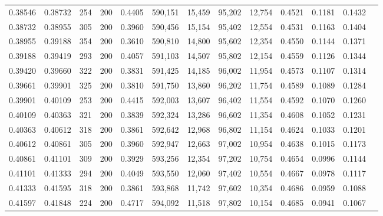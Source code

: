 \begin{tabular}{rrrrrrrrrrrrr}
0.38546 & 0.38732 &   254 & 200 &                                     0.4405 & 590,151 &  15,459 &  95,202 &  12,754 & 0.4521 & 0.1181 & 0.1432 \\
0.38732 & 0.38955 &   305 & 200 &                                     0.3960 & 590,456 &  15,154 &  95,402 &  12,554 & 0.4531 & 0.1163 & 0.1404 \\
0.38955 & 0.39188 &   354 & 200 &                                     0.3610 & 590,810 &  14,800 &  95,602 &  12,354 & 0.4550 & 0.1144 & 0.1371 \\
0.39188 & 0.39419 &   293 & 200 &                                     0.4057 & 591,103 &  14,507 &  95,802 &  12,154 & 0.4559 & 0.1126 & 0.1344 \\
0.39420 & 0.39660 &   322 & 200 &                                     0.3831 & 591,425 &  14,185 &  96,002 &  11,954 & 0.4573 & 0.1107 & 0.1314 \\
0.39661 & 0.39901 &   325 & 200 &                                     0.3810 & 591,750 &  13,860 &  96,202 &  11,754 & 0.4589 & 0.1089 & 0.1284 \\
0.39901 & 0.40109 &   253 & 200 &                                     0.4415 & 592,003 &  13,607 &  96,402 &  11,554 & 0.4592 & 0.1070 & 0.1260 \\
0.40109 & 0.40363 &   321 & 200 &                                     0.3839 & 592,324 &  13,286 &  96,602 &  11,354 & 0.4608 & 0.1052 & 0.1231 \\
0.40363 & 0.40612 &   318 & 200 &                                     0.3861 & 592,642 &  12,968 &  96,802 &  11,154 & 0.4624 & 0.1033 & 0.1201 \\
0.40612 & 0.40861 &   305 & 200 &                                     0.3960 & 592,947 &  12,663 &  97,002 &  10,954 & 0.4638 & 0.1015 & 0.1173 \\
0.40861 & 0.41101 &   309 & 200 &                                     0.3929 & 593,256 &  12,354 &  97,202 &  10,754 & 0.4654 & 0.0996 & 0.1144 \\
0.41101 & 0.41333 &   294 & 200 &                                     0.4049 & 593,550 &  12,060 &  97,402 &  10,554 & 0.4667 & 0.0978 & 0.1117 \\
0.41333 & 0.41595 &   318 & 200 &                                     0.3861 & 593,868 &  11,742 &  97,602 &  10,354 & 0.4686 & 0.0959 & 0.1088 \\
0.41597 & 0.41848 &   224 & 200 &                                     0.4717 & 594,092 &  11,518 &  97,802 &  10,154 & 0.4685 & 0.0941 & 0.1067 \\

\end{tabular}

